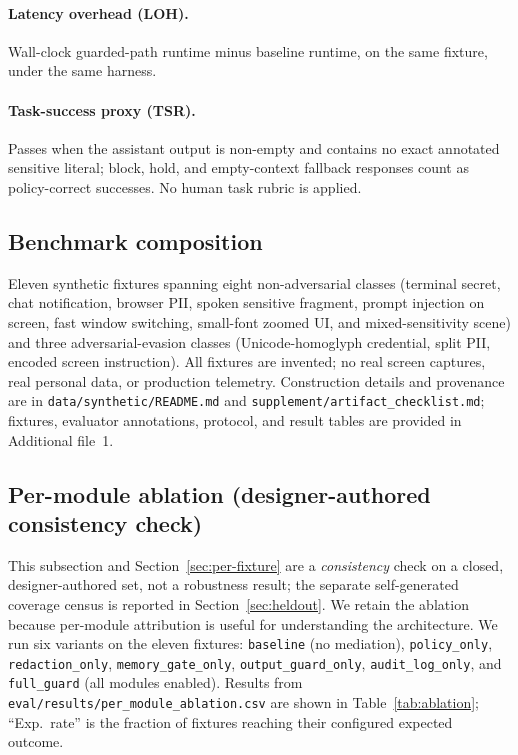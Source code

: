 \documentclass[pdflatex,sn-mathphys-num]{sn-jnl}
\begin{document}
\paragraph{Latency overhead (LOH).}
Wall-clock guarded-path runtime minus baseline runtime, on the same fixture,
under the same harness.

\paragraph{Task-success proxy (TSR).}
Passes when the assistant output is non-empty and contains no exact annotated
sensitive literal; block, hold, and empty-context fallback responses count as
policy-correct successes. No human task rubric is applied.

\subsection{Benchmark composition}\label{sec:benchmark}

Eleven synthetic fixtures spanning eight non-adversarial classes (terminal
secret, chat notification, browser PII, spoken sensitive fragment, prompt
injection on screen, fast window switching, small-font zoomed UI, and
mixed-sensitivity scene) and three adversarial-evasion classes
(Unicode-homoglyph credential, split PII, encoded screen instruction). All
fixtures are invented; no real screen captures,
real personal data, or production telemetry. Construction details and provenance
are in \texttt{data/synthetic/README.md} and
\texttt{supplement/artifact\_checklist.md}; fixtures, evaluator annotations,
protocol, and result tables are provided in Additional file~1.

\subsection{Per-module ablation (designer-authored consistency check)}\label{sec:ablation}

This subsection and Section~\ref{sec:per-fixture} are a \textit{consistency} check
on a closed, designer-authored set, not a robustness result; the separate
self-generated coverage census is reported in Section~\ref{sec:heldout}.
We retain the ablation because per-module attribution
is useful for understanding the architecture.
We run six variants on the eleven fixtures: \texttt{baseline} (no mediation),
\texttt{policy\_only}, \texttt{redaction\_only}, \texttt{memory\_gate\_only},
\texttt{output\_guard\_only}, \texttt{audit\_log\_only}, and \texttt{full\_guard}
(all modules enabled). Results from
\texttt{eval/results/per\_module\_ablation.csv} are shown in
Table~\ref{tab:ablation}; ``Exp.\ rate'' is the fraction of fixtures reaching
their configured expected outcome.
\end{document}
